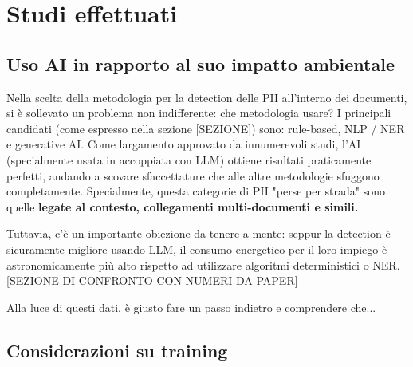 \chapter{Studi effettuati}
\label{cap:studi}

\section{Uso AI in rapporto al suo impatto ambientale}
Nella scelta della metodologia per la detection delle PII all'interno dei documenti, si è sollevato un problema non indifferente: che metodologia usare? I principali candidati (come espresso nella sezione [SEZIONE]) sono: rule-based, NLP / NER e generative AI. Come largamento approvato da innumerevoli studi, l'AI (specialmente usata in accoppiata con LLM) ottiene risultati praticamente perfetti, andando a scovare sfaccettature che alle altre metodologie sfuggono completamente. Specialmente, questa categorie di PII "perse per strada" sono quelle \textbf{legate al contesto, collegamenti multi-documenti e simili.} \medskip

Tuttavia, c'è un importante obiezione da tenere a mente: seppur la detection è sicuramente migliore usando LLM, il consumo energetico per il loro impiego è astronomicamente più alto rispetto ad utilizzare algoritmi deterministici o NER. [SEZIONE DI CONFRONTO CON NUMERI DA PAPER] \medskip

Alla luce di questi dati, è giusto fare un passo indietro e comprendere che...

\section{Considerazioni su training}
\label{sec:considerazioni-training}

